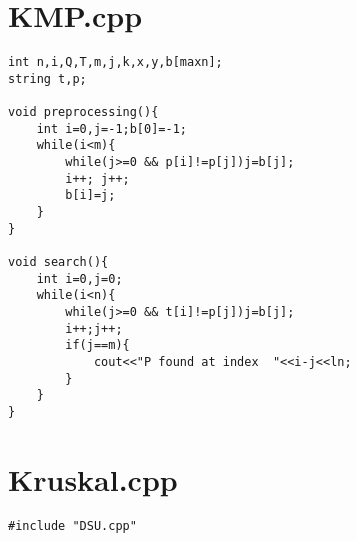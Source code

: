 \documentclass[a4paper,landscape,8pt]{extarticle}
\begin{document}
\begin{multicols}{3}
\begin{lstlisting}
\end{lstlisting}

%

\section*{KMP.cpp}

\begin{lstlisting}
int n,i,Q,T,m,j,k,x,y,b[maxn];
string t,p;

void preprocessing(){
    int i=0,j=-1;b[0]=-1;
    while(i<m){
        while(j>=0 && p[i]!=p[j])j=b[j];
        i++; j++;
        b[i]=j;
    }
}

void search(){
    int i=0,j=0;
    while(i<n){
        while(j>=0 && t[i]!=p[j])j=b[j];
        i++;j++;
        if(j==m){
            cout<<"P found at index  "<<i-j<<ln;
        }
    }
}
\end{lstlisting}

\section*{Kruskal.cpp}

\begin{lstlisting}
#include "DSU.cpp"


\end{lstlisting}
\end{multicols}
\end{document}
